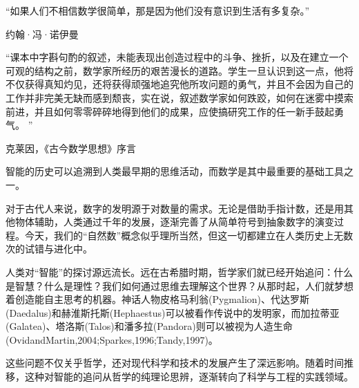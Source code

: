 

“如果人们不相信数学很简单，那是因为他们没有意识到生活有多复杂。”
\begin{flushright}
约翰·冯·诺伊曼
\end{flushright}

“课本中字斟句酌的叙述，未能表现出创造过程中的斗争、挫折，以及在建立一个可观的结构之前，数学家所经历的艰苦漫长的道路。学生一旦认识到这一点，他将不仅获得真知灼见，还将获得顽强地追究他所攻问题的勇气，并且不会因为自己的工作并非完美无缺而感到颓丧，实在说，叙述数学家如何跌跤，如何在迷雾中摸索前进，并且如何零零碎碎地得到他们的成果，应使搞研究工作的任一新手鼓起勇气。  ”
\begin{flushright}
                                                 克莱因，《古今数学思想》序言
\end{flushright}

智能的历史可以追溯到人类最早期的思维活动，而数学是其中最重要的基础工具之一。

对于古代人来说，数字的发明源于对数量的需求。无论是借助手指计数，还是用其他物体辅助，人类通过千年的发展，逐渐完善了从简单符号到抽象数字的演变过程。今天，我们的“自然数”概念似乎理所当然，但这一切都建立在人类历史上无数次的试错与进化中。

人类对“智能”的探讨源远流长。远在古希腊时期，哲学家们就已经开始追问：什么是智慧？什么是理性？我们如何通过思维去理解这个世界？从那时起，人们就梦想着创造能自主思考的机器。神话人物皮格马利翁(Pygmalion)、代达罗斯(Daedalus)和赫淮斯托斯(Hephaestus)可以被看作传说中的发明家，而加拉蒂亚(Galatea)、塔洛斯(Talos)和潘多拉(Pandora)则可以被视为人造生命(OvidandMartin,2004;Sparkes,1996;Tandy,1997)。

这些问题不仅关乎哲学，还对现代科学和技术的发展产生了深远影响。随着时间推移，这种对智能的追问从哲学的纯理论思辨，逐渐转向了科学与工程的实践领域。

